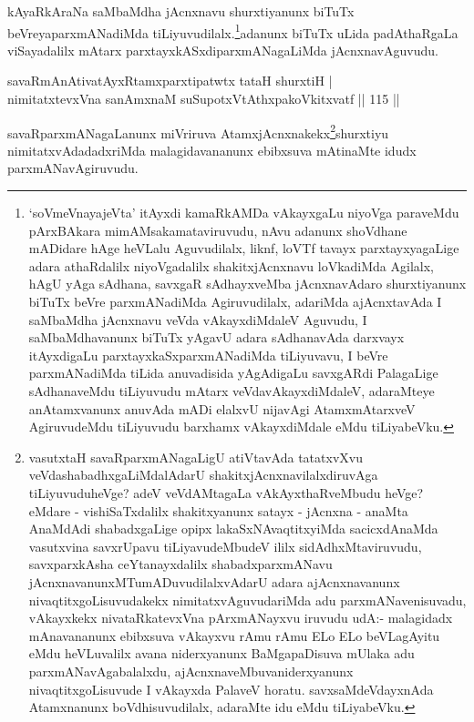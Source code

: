 \begin{artha}
kAyaRkAraNa saMbaMdha jAcnxnavu shurxtiyanunx biTuTx beVreyaparxmANadiMda tiLiyuvudilalx.\footnote{`soVmeVnayajeVta' itAyxdi kamaRkAMDa vAkayxgaLu niyoVga paraveMdu pArxBAkara mimAMsakamataviruvudu, nAvu adanunx shoVdhane mADidare hAge heVLalu Aguvudilalx, liknf, loVTf tavayx  parxtayxyagaLige adara athaRdalilx niyoVgadalilx shakitxjAcnxnavu loVkadiMda Agilalx, hAgU yAga sAdhana, savxgaR sAdhayxveMba jAcnxnavAdaro shurxtiyanunx biTuTx beVre parxmANadiMda Agiruvudilalx, adariMda ajAcnxtavAda I saMbaMdha jAcnxnavu veVda vAkayxdiMdaleV Aguvudu, I saMbaMdhavanunx biTuTx yAgavU adara sAdhanavAda darxvayx itAyxdigaLu parxtayxkaSxparxmANadiMda tiLiyuvavu, I beVre parxmANadiMda tiLida anuvadisida yAgAdigaLu savxgARdi PalagaLige sAdhanaveMdu tiLiyuvudu mAtarx veVdavAkayxdiMdaleV, adaraMteye anAtamxvanunx anuvAda mADi elalxvU nijavAgi AtamxmAtarxveV AgiruvudeMdu tiLiyuvudu barxhamx vAkayxdiMdale eMdu tiLiyabeVku.}adanunx biTuTx uLida padAthaRgaLa viSayadalilx mAtarx parxtayxkASxdi\-parxmANagaLiMda jAcnxnavAguvudu.
\end{artha}

\begin{shl}
savaRmAnAtivatAyxRtamxparxtipatwtx tataH shurxtiH |\\
nimitatxtevxVna sanAmxnaM suSupotxVtAthxpakoVkitxvatf \hfill || 115 ||
\end{shl}

\begin{artha}
savaRparxmANagaLanunx miVriruva AtamxjAcnxnakekx\footnote{vasutxtaH savaRparxmANagaLigU atiVtavAda tatatxvXvu veVdashabadhxgaLiMdalAdarU shakitxjAcnxnavilalxdiruvAga tiLiyuvuduheVge? adeV veVdAMtagaLa vAkAyxthaRveMbudu heVge? eMdare - vishiSaTxdalilx shakitxyanunx satayx - jAcnxna - anaMta AnaMdAdi shabadxgaLige opipx lakaSxNAvaqtitxyiMda sacicxdAnaMda vasutxvina savxrUpavu tiLiyavudeMbudeV ililx sidAdhxMtaviruvudu, savxparxkAsha ceYtanayxdalilx shabadxparxmANavu jAcnxnavanunxMTumADuvudilalxvAdarU adara ajAcnxnavanunx nivaqtitxgoLisuvudakekx nimitatxvAguvudariMda adu parxmANavenisuvadu, vAkayxkekx nivataRkatevxVna pArxmANayxvu iruvudu udA:- malagidadx mAnavananunx ebibxsuva vAkayxvu rAmu rAmu ELo ELo beVLagAyitu eMdu heVLuvalilx avana niderxyanunx BaMgapaDisuva mUlaka adu parxmANavAgabalalxdu, ajAcnxnaveMbuvaniderxyanunx nivaqtitxgoLisuvude I vAkayxda PalaveV horatu. savxsaMdeVdayxnAda Atamxnanunx boVdhisuvudilalx, adaraMte idu eMdu tiLiyabeVku.}shurxtiyu nimitatxvAdadadxriMda 
malagidavananunx ebibxsuva mAtinaMte idudx parxmANavAgiruvudu.
\end{artha}

